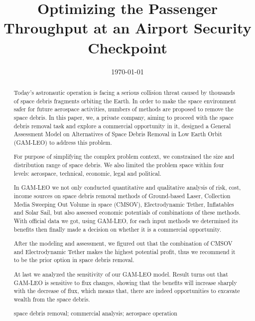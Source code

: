 \documentclass{mcmthesis}
\begin{document}
\title{Optimizing the Passenger Throughput at an Airport Security Checkpoint}

\date{\today}
	\begin{abstract}
		
		Today's astronautic operation is facing a serious collision threat caused by thousands of space debris fragments orbiting the Earth. In order to make the space environment safer for future aerospace activities, numbers of methods are proposed to remove the space debris. In this paper, we, a private company, aiming to proceed with the space debris removal task and explore a commercial opportunity in it, designed a General Assessment Model on Alternatives of Space Debris Removal in Low Earth Orbit (GAM-LEO) to address this problem.
		
		For purpose of simplifying the complex problem context, we constrained the size and distribution range of space debris.  We also limited the problem space within four levels: aerospace, technical, economic, legal and political.
		
		In GAM-LEO we not only conducted quantitative and qualitative analysis of risk, cost, income sources on space debris removal methods of Ground-based Laser, Collection Media Sweeping Out Volume in space (CMSOV), Electrodynamic Tether, Inflatables and Solar Sail, but also assessed economic potentials of combinations of these methods. With official data we got, using GAM-LEO, for each input methods we determined its benefits then finally made a decision on whether it is a commercial opportunity.
		
		After the modeling and assessment, we figured out that the combination of CMSOV and Electrodynamic Tether makes the highest potential profit, thus we recommend it to be the prior option in space debris removal.
		
		At last we analyzed the sensitivity of our GAM-LEO model. Result turns out that GAM-LEO is sensitive to flux changes, showing that the benefits will increase sharply with the decrease of flux, which means that, there are indeed opportunities to excavate wealth from the space debris.
		
		\begin{keywords}
			space debris removal; commercial analysis; aerospace operation
		\end{keywords}
	\end{abstract}

\maketitle
\end{document}
